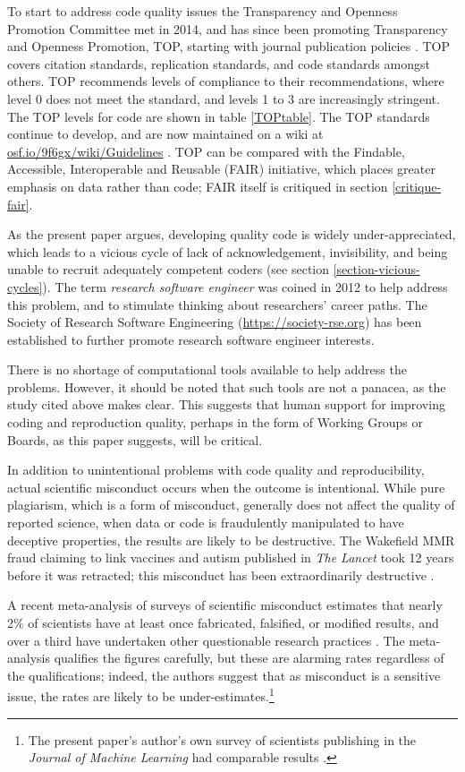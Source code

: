 \documentclass{comjnl}
\begin{document}
To start to address code quality issues the Transparency and Openness Promotion Committee met in 2014, and has since been promoting Transparency and Openness Promotion, TOP, starting with journal publication policies \cite{TOP}. TOP covers citation standards, replication standards, and code standards amongst others. TOP recommends levels of compliance to their recommendations, where level 0 does not meet the standard, and levels 1 to 3 are increasingly stringent. The TOP levels for code are shown in table \ref{TOPtable}. The TOP standards continue to develop, and are now maintained on a wiki at \url{osf.io/9f6gx/wiki/Guidelines} \cite{TOP-wiki}. TOP can be compared with the Findable, Accessible, Interoperable and Reusable (FAIR) initiative, which places greater emphasis on data rather than code; FAIR itself is critiqued in section \ref{critique-fair}.

As the present paper argues, developing quality code is widely under-appreciated, which leads to a vicious cycle of lack of acknowledgement, invisibility, and being unable to recruit adequately competent coders (see section \ref{section-vicious-cycles}). The term \emph{research software engineer\/} was coined in 2012 to help address this problem, and to stimulate thinking about researchers' career paths. The Society of Research Software Engineering (\url{https://society-rse.org}) has been established to further promote research software engineer interests.  

There is no shortage of computational tools available to help address the problems. However, it should be noted that such tools are not a panacea, as the study \cite{jupyter-study} cited above makes clear. This suggests that human support for improving coding and reproduction quality, perhaps in the form of Working Groups or Boards, as this paper suggests, will be critical.

In addition to unintentional problems with code quality and reproducibility, actual scientific misconduct occurs when the outcome is intentional. While pure plagiarism, which is a form of misconduct, generally does not affect the quality of reported science, when data or code is fraudulently manipulated to have deceptive properties, the results are likely to be destructive. The Wakefield MMR fraud claiming to link vaccines and autism published in \emph{The Lancet\/} took 12 years before it was retracted; this misconduct has been extraordinarily destructive \cite{MMR-fraud}. 

A recent meta-analysis of surveys of scientific misconduct estimates that nearly 2\% of scientists have at least once fabricated, falsified, or modified results, and over a third have undertaken other questionable research practices \cite{misconduct-issues}. The meta-analysis qualifies the figures carefully, but these are alarming rates regardless of the qualifications; indeed, the authors suggest that as misconduct is a sensitive issue, the rates are likely to be under-estimates.\footnote{The present paper's author's own survey of scientists publishing in the \emph{Journal of Machine Learning\/} had comparable results \cite{machine-learning-reproducibility}.} 
\end{document}
